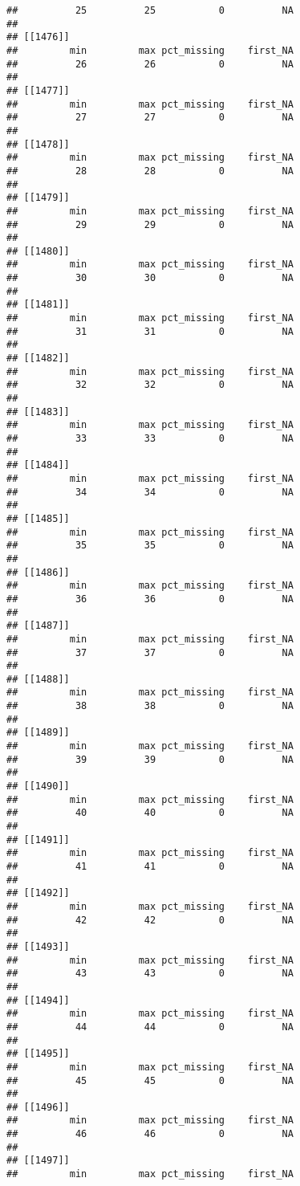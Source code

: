 \documentclass[
]{article}
\begin{document}
\begin{verbatim}
##          25          25           0          NA 
## 
## [[1476]]
##         min         max pct_missing    first_NA 
##          26          26           0          NA 
## 
## [[1477]]
##         min         max pct_missing    first_NA 
##          27          27           0          NA 
## 
## [[1478]]
##         min         max pct_missing    first_NA 
##          28          28           0          NA 
## 
## [[1479]]
##         min         max pct_missing    first_NA 
##          29          29           0          NA 
## 
## [[1480]]
##         min         max pct_missing    first_NA 
##          30          30           0          NA 
## 
## [[1481]]
##         min         max pct_missing    first_NA 
##          31          31           0          NA 
## 
## [[1482]]
##         min         max pct_missing    first_NA 
##          32          32           0          NA 
## 
## [[1483]]
##         min         max pct_missing    first_NA 
##          33          33           0          NA 
## 
## [[1484]]
##         min         max pct_missing    first_NA 
##          34          34           0          NA 
## 
## [[1485]]
##         min         max pct_missing    first_NA 
##          35          35           0          NA 
## 
## [[1486]]
##         min         max pct_missing    first_NA 
##          36          36           0          NA 
## 
## [[1487]]
##         min         max pct_missing    first_NA 
##          37          37           0          NA 
## 
## [[1488]]
##         min         max pct_missing    first_NA 
##          38          38           0          NA 
## 
## [[1489]]
##         min         max pct_missing    first_NA 
##          39          39           0          NA 
## 
## [[1490]]
##         min         max pct_missing    first_NA 
##          40          40           0          NA 
## 
## [[1491]]
##         min         max pct_missing    first_NA 
##          41          41           0          NA 
## 
## [[1492]]
##         min         max pct_missing    first_NA 
##          42          42           0          NA 
## 
## [[1493]]
##         min         max pct_missing    first_NA 
##          43          43           0          NA 
## 
## [[1494]]
##         min         max pct_missing    first_NA 
##          44          44           0          NA 
## 
## [[1495]]
##         min         max pct_missing    first_NA 
##          45          45           0          NA 
## 
## [[1496]]
##         min         max pct_missing    first_NA 
##          46          46           0          NA 
## 
## [[1497]]
##         min         max pct_missing    first_NA 

\end{verbatim}
\end{document}
